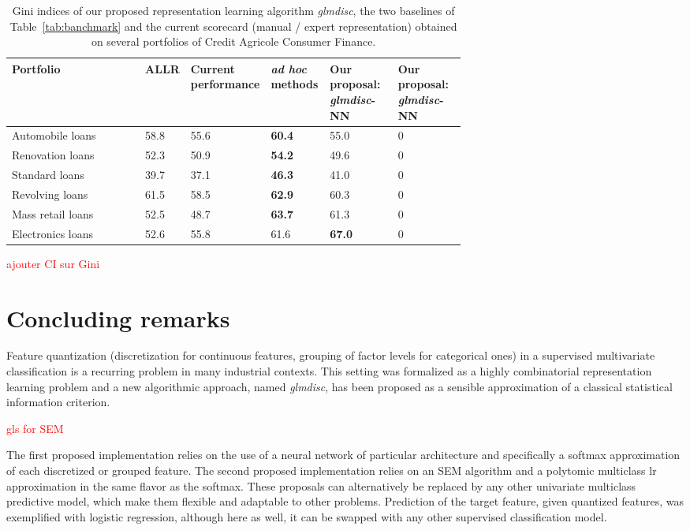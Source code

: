 \begin{table}
    \centering
\begin{tabular}{lp{0.1\linewidth}p{0.138\linewidth}p{0.13\linewidth}p{0.15\linewidth}p{0.15\linewidth}}
Portfolio & ALLR & Current \hspace{0.5cm} performance & \textit{ad hoc} methods & Our proposal: \textit{glmdisc}-NN & Our proposal: \textit{glmdisc}-NN \\
\hline
Automobile loans & 58.8 & 55.6 & \bf{60.4} & 55.0 & 0 \\
Renovation loans & 52.3 & 50.9 & \bf{54.2} & 49.6 & 0 \\
Standard loans & 39.7 & 37.1 & \bf{46.3} & 41.0 & 0 \\
Revolving loans & 61.5 & 58.5 & \bf{62.9} & 60.3 & 0 \\
Mass retail loans & 52.5 & 48.7 & \bf{63.7} &61.3 & 0 \\
Electronics loans & 52.6 & 55.8 & 61.6  & \bf{67.0} & 0 
\end{tabular}
    \caption{Gini indices of our proposed representation learning algorithm \textit{glmdisc}, the two baselines of Table~\ref{tab:banchmark} and the current scorecard (manual / expert representation) obtained on several portfolios of Credit Agricole Consumer Finance.}
    \label{tab:real_data}
\end{table}

\textcolor{red}{ajouter CI sur Gini}

\section{Concluding remarks}

Feature quantization (discretization for continuous features, grouping of factor levels for categorical ones) in a supervised multivariate classification is a recurring problem in many industrial contexts. This setting was formalized as a highly combinatorial representation learning problem and a new algorithmic approach, named \textit{glmdisc}, has been proposed as a sensible approximation of a classical statistical information criterion.

\textcolor{red}{gls for SEM}

The first proposed implementation relies on the use of a neural network of particular architecture and specifically a softmax approximation of each discretized or grouped feature. The second proposed implementation relies on an SEM algorithm and a polytomic multiclass \gls{lr} approximation in the same flavor as the softmax. These proposals can alternatively be replaced by any other univariate multiclass predictive model, which make them flexible and adaptable to other problems. Prediction of the target feature, given quantized features, was exemplified with logistic regression, although here as well, it can be swapped with any other supervised classification model.

